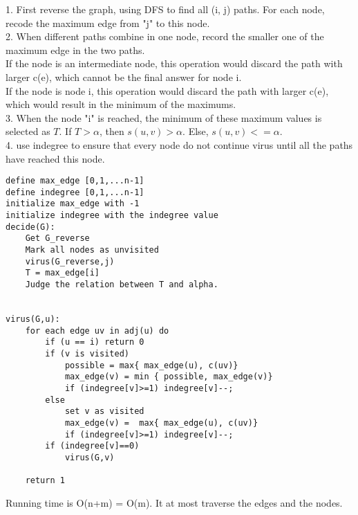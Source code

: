 \documentclass[12pt,a4paper]{article}
\newcommand{\question}[1]{\bigskip\noindent{\textbf{Q{#1} solution}}}
\begin{document}
1. First reverse the graph, using DFS to find all (i, j) paths. For each node, recode the maximum edge from "j" to this node. \\
2. When different paths combine in one node, record the smaller one of the maximum edge in the two paths. \\
If the node is an intermediate node, this operation would discard the path with larger c(e), which cannot be the final answer for node i.\\
If the node is node i, this operation would discard the path with larger c(e), which would result in the minimum of the maximums.\\
3. When the node "i" is reached, the minimum of these maximum values is selected as $T$. If $T> \alpha$, then $s(u,v)> \alpha$. Else, $s(u,v)<= \alpha$.\\
4. use indegree to ensure that every node do not continue virus until all the paths have reached this node.\\
\begin{lstlisting}
define max_edge [0,1,...n-1]
define indegree [0,1,...n-1]
initialize max_edge with -1
initialize indegree with the indegree value
decide(G):
	Get G_reverse
	Mark all nodes as unvisited
	virus(G_reverse,j)
	T = max_edge[i]
	Judge the relation between T and alpha.
	

virus(G,u):
	for each edge uv in adj(u) do
		if (u == i) return 0
		if (v is visited)
			possible = max{ max_edge(u), c(uv)}
			max_edge(v) = min { possible, max_edge(v)} 
			if (indegree[v]>=1) indegree[v]--;
		else
			set v as visited
			max_edge(v) =  max{ max_edge(u), c(uv)}
			if (indegree[v]>=1) indegree[v]--;
		if (indegree[v]==0)
			virus(G,v)

	return 1
\end{lstlisting}
Running time is O(n+m) = O(m). It at most traverse the edges and the nodes.

\question{28.C}
\end{document}

